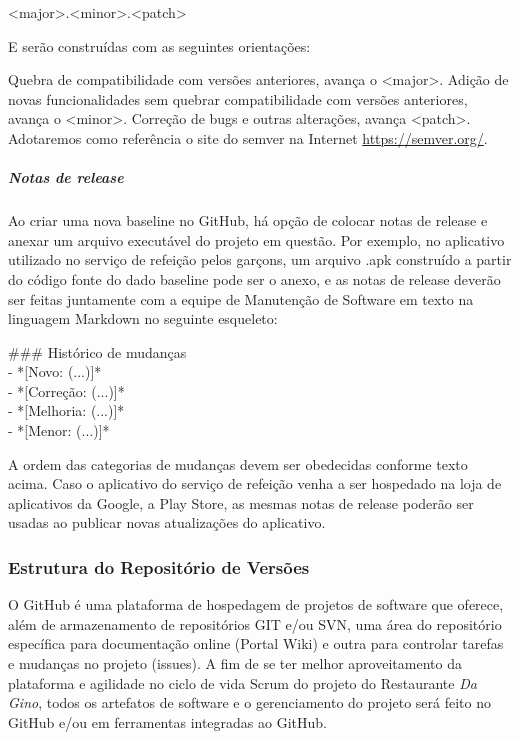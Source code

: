 \begin{myprop}
<major>.<minor>.<patch>
\end{myprop}

E serão construídas com as seguintes orientações:

Quebra de compatibilidade com versões anteriores, avança o <major>.
Adição de novas funcionalidades sem quebrar compatibilidade com versões anteriores, avança o <minor>.
Correção de bugs e outras alterações, avança <patch>.
Adotaremos como referência o site do semver na Internet \url{https://semver.org/}.

\subparagraph{Notas de release}

Ao criar uma nova baseline no GitHub, há opção de colocar notas de release e anexar um arquivo executável do projeto em questão. Por exemplo, no aplicativo utilizado no serviço de refeição pelos garçons, um arquivo .apk construído a partir do código fonte do dado baseline pode ser o anexo, e as notas de release deverão ser feitas juntamente com a equipe de Manutenção de Software em texto na linguagem Markdown no seguinte esqueleto:

\begin{myprop}
\#\#\# Histórico de mudanças \\
- *[Novo: (...)]* \\
- *[Correção: (...)]* \\
- *[Melhoria: (...)]* \\
- *[Menor: (...)]* 
\end{myprop}

A ordem das categorias de mudanças devem ser obedecidas conforme texto acima. Caso o aplicativo do serviço de refeição venha a ser hospedado na loja de aplicativos da Google, a Play Store, as mesmas notas de release poderão ser usadas ao publicar novas atualizações do aplicativo.

\subsubsection{Estrutura do Repositório de Versões}

O GitHub é uma plataforma de hospedagem de projetos de software que oferece, além de armazenamento de repositórios GIT e/ou SVN, uma área do repositório específica para documentação online (Portal Wiki) e outra para controlar tarefas e mudanças no projeto (issues). A fim de se ter melhor aproveitamento da plataforma e agilidade no ciclo de vida Scrum do projeto do Restaurante \textit{Da Gino}, todos os artefatos de software e o gerenciamento do projeto será feito no GitHub e/ou em ferramentas integradas ao GitHub.

